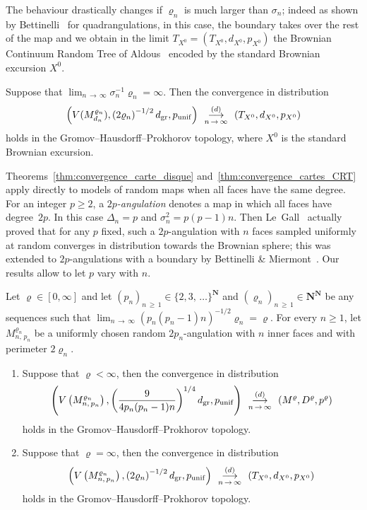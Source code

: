 \documentclass[AHL,Unicode,longabstracts,published]{cedram}
\newcommand{\ensembles}[1]{\mathbf{#1}}
\newcommand{\N}{\ensembles{N}}
\newcommand{\1}{\ensembles{1}}
\renewcommand{\ge}{\geqslant}
\newcommand{\Bmap}{M}
\newcommand{\dBmap}{D}
\newcommand{\pBmap}{p}
\newcommand{\CRT}{T}
\newcommand{\dCRT}{d}
\newcommand{\pCRT}{p}
\newcommand{\mn}{M_{d_n}^{\varrho_n}}
\newcommand{\dgr}{d_{\mathrm{gr}}}
\newcommand{\pgr}{p_{\mathrm{unif}}}
\newcommand{\cvloi}[1][n]{\enskip\mathop{\longrightarrow}^{(d)}_{#1\,\to\, \infty}\enskip}
\begin{document}
The behaviour drastically changes if $\varrho_n$ is much larger than $\sigma_n$; indeed as shown by Bettinelli~\cite[Theorem~5]{Bet15} for quadrangulations, in this case, the boundary takes over the rest of the map and we obtain in the limit $\CRT_{X^0} = (\CRT_{X^0}, \dCRT_{X^0}, \pCRT_{X^0})$ the Brownian Continuum Random Tree of Aldous~\cite{Ald93} encoded by the standard Brownian excursion $X^0$.

\begin{theo}\label{thm:convergence_cartes_CRT}
Suppose that $\lim_{n\,\to\,\infty} \sigma_n^{-1} \varrho_n = \infty$. Then the convergence in distribution
\[
\left(V(\mn), \left(2\varrho_n\right)^{-1/2} \dgr, \pgr\right) \cvloi \left(\CRT_{X^0}, \dCRT_{X^0}, \pCRT_{X^0}\right)
\]
holds in the Gromov--Hausdorff--Prokhorov topology, where $X^0$ is the standard Brownian excursion.
\end{theo}

Theorems~\ref{thm:convergence_carte_disque} and~\ref{thm:convergence_cartes_CRT} apply directly to models of random maps when all faces have the same degree. For an integer $p \ge 2$, a \emph{$2p$-angulation} denotes a map in which all faces have degree~$2p$. In this case $\Delta_n = p$ and $\sigma_n^2 = p(p-1)n$. Then Le~Gall~\cite[Theorem~1]{LG13} actually proved that for any $p$ fixed, such a $2p$-angulation with $n$ faces sampled uniformly at random converges in distribution towards the Brownian sphere; this was extended to $2p$-angulations with a boundary by Bettinelli \& Miermont~\cite[Corollary~6]{BM17}. Our results allow to let $p$ vary with $n$.

\begin{coro}\label{cor:convergence_d_ang}
Let $\varrho \in [0,\infty]$ and let $(p_n)_{n\,\ge\,1} \in \{2, 3,\,\dots\}^\N$ and $(\varrho_n)_{n\,\ge\,1} \in \N^\N$ be any sequences such that $\lim_{n\,\to\,\infty} (p_n (p_n-1) n)^{-1/2} \varrho_n = \varrho$. For every $n \ge 1$, let $M^{\varrho_n}_{n,\, p_n}$ be a uniformly chosen random $2p_n$-angulation with $n$ inner faces and with perimeter $2\varrho_n$.
\begin{enumerate}
\item Suppose that $\varrho < \infty$, then the convergence in distribution
\[
\left(V\left(M^{\varrho_n}_{n,\,p_n}\right), \left(\frac{9}{4 p_n (p_n-1) n}\right)^{1/4} \dgr, \pgr\right) \cvloi \left(\Bmap^\varrho,\dBmap^\varrho, \pBmap^\varrho\right)
\]
holds in the Gromov--Hausdorff--Prokhorov topology.

\item Suppose that $\varrho = \infty$, then the convergence in distribution
\[
\left(V\left(M^{\varrho_n}_{n,\,p_n}\right), \left(2\varrho_n\right)^{-1/2} \dgr, \pgr\right) \cvloi \left(\CRT_{X^0}, \dCRT_{X^0}, \pCRT_{X^0}\right)
\]
holds in the Gromov--Hausdorff--Prokhorov topology.
\end{enumerate}
\end{coro}
\end{document}
